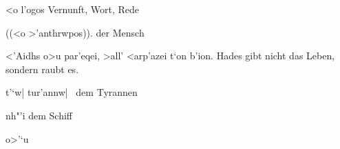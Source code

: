 
\agr <o l'ogos \rm Vernunft, Wort, Rede

\agr ((<o >'anthrwpos)). \rm der Mensch

\agr <'Aidhs o>u par'eqei, >all' <arp'azei t`on b'ion.
\rm Hades gibt nicht das Leben, sondern raubt es.

\agr t'`w| tur'annw| \rm\ dem Tyrannen

\agr nh"'i \rm dem Schiff

\agr o>'`u

\bye
